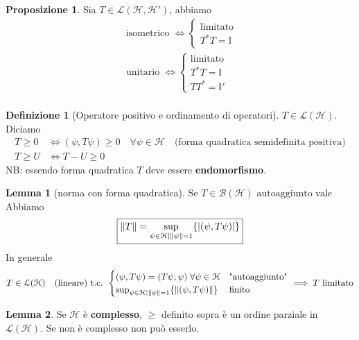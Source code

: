 \documentclass[a4paper,10pt]{article}
\theoremstyle{definition}
\newcommand{\hil}{\mathcal{H}} %
\theoremstyle{indentdefinition}
\newtheorem{defn}{Definizione}[section]
\theoremstyle{indenttheorem}
\newtheorem{prop}{Proposizione}
\newtheorem{lem*}{Lemma}
\theoremstyle{myremark}
\theoremstyle{indentgeneral}
\begin{document}
\begin{prop}
    Sia $ T\in \mathcal{L}(\mathcal{H},\mathcal{H}')$, abbiamo
    \begin{align*}
        \text{ isometrico } \iff \begin{cases}
            \text{limitato}\\
            T^*T=\mathbb{I}
        \end{cases}\\
       \text{ unitario } \iff \begin{cases}
            \text{limitato}\\
            T^*T=\mathbb{I}\\
            TT^*=\mathbb{I}'
        \end{cases}\\
    \end{align*}
\end{prop}

\begin{defn}[Operatore positivo e ordinamento di operatori]
$T\in\mathcal{L}(\hil).$ Diciamo 
\begin{align*}
    T\ge0 &\iff(\psi,T\psi)\ge0\quad \forall\psi\in\hil \quad \text{(forma quadratica semidefinita positiva)}\\
    T\ge U &\iff T-U\ge 0 
\end{align*}
NB: essendo forma quadratica $T$ deve essere \textbf{endomorfismo}.
\end{defn}


\begin{lem*}[norma con forma quadratica] \label{lem-norma-forma-quadratica} Se $T\in\mathcal{B}(\hil)\text{ autoaggiunto}$ vale
    Abbiamo
    $$\boxed{\norm{T}=\sup_{\psi\in\hil\mid\norm{\psi}=1}\{\abs{(\psi,T\psi)}\}}$$
    In generale $$ T\in\mathcal{L}(\hil) \quad \text{(lineare) t.c. }\begin{cases}
        (\psi,T\psi)=(T\psi ,\psi) \;\forall\psi\in\hil &  \text{"autoaggiunto"} \\
        \sup_{\psi\in\hil\mid\norm{\psi}=1}\{\norm{(\psi,T\psi)}\} & \text{finito}
    \end{cases}\implies T \text{ limitato}$$
\end{lem*}

\begin{lem*}
    Se $\hil$ è \textbf{complesso}, $\ge$ definito sopra è un ordine parziale in $\mathcal{L}(\hil)$. Se non è complesso non può esserlo.
\end{lem*}
\end{document}
